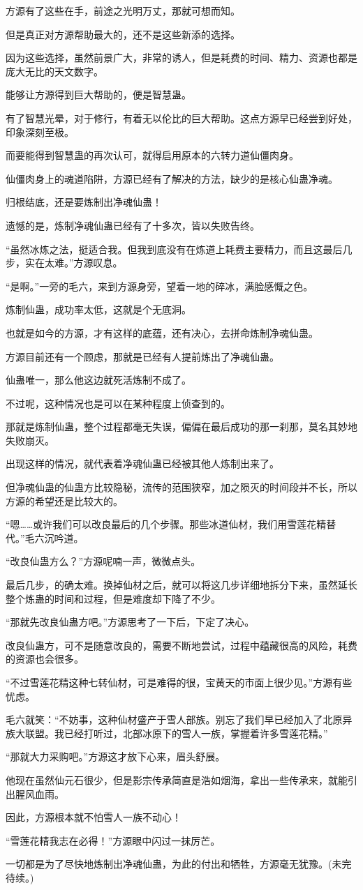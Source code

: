 \begin{this_body}
方源有了这些在手，前途之光明万丈，那就可想而知。

但是真正对方源帮助最大的，还不是这些新添的选择。

因为这些选择，虽然前景广大，非常的诱人，但是耗费的时间、精力、资源也都是庞大无比的天文数字。

能够让方源得到巨大帮助的，便是智慧蛊。

有了智慧光晕，对于修行，有着无以伦比的巨大帮助。这点方源早已经尝到好处，印象深刻至极。

而要能得到智慧蛊的再次认可，就得启用原本的六转力道仙僵肉身。

仙僵肉身上的魂道陷阱，方源已经有了解决的方法，缺少的是核心仙蛊净魂。

归根结底，还是要炼制出净魂仙蛊！

遗憾的是，炼制净魂仙蛊已经有了十多次，皆以失败告终。

“虽然冰炼之法，挺适合我。但我到底没有在炼道上耗费主要精力，而且这最后几步，实在太难。”方源叹息。

“是啊。”一旁的毛六，来到方源身旁，望着一地的碎冰，满脸感慨之色。

炼制仙蛊，成功率太低，这就是个无底洞。

也就是如今的方源，才有这样的底蕴，还有决心，去拼命炼制净魂仙蛊。

方源目前还有一个顾虑，那就是已经有人提前炼出了净魂仙蛊。

仙蛊唯一，那么他这边就死活炼制不成了。

不过呢，这种情况也是可以在某种程度上侦查到的。

那就是炼制仙蛊，整个过程都毫无失误，偏偏在最后成功的那一刹那，莫名其妙地失败崩灭。

出现这样的情况，就代表着净魂仙蛊已经被其他人炼制出来了。

但净魂仙蛊的仙蛊方比较隐秘，流传的范围狭窄，加之陨灭的时间段并不长，所以方源的希望还是比较大的。

“嗯……或许我们可以改良最后的几个步骤。那些冰道仙材，我们用雪莲花精替代。”毛六沉吟道。

“改良仙蛊方么？”方源呢喃一声，微微点头。

最后几步，的确太难。换掉仙材之后，就可以将这几步详细地拆分下来，虽然延长整个炼蛊的时间和过程，但是难度却下降了不少。

“那就先改良仙蛊方吧。”方源思考了一下后，下定了决心。

改良仙蛊方，可不是随意改良的，需要不断地尝试，过程中蕴藏很高的风险，耗费的资源也会很多。

“不过雪莲花精这种七转仙材，可是难得的很，宝黄天的市面上很少见。”方源有些忧虑。

毛六就笑：“不妨事，这种仙材盛产于雪人部族。别忘了我们早已经加入了北原异族大联盟。我已经打听过，北部冰原下的雪人一族，掌握着许多雪莲花精。”

“那就大力采购吧。”方源这才放下心来，眉头舒展。

他现在虽然仙元石很少，但是影宗传承简直是浩如烟海，拿出一些传承来，就能引出腥风血雨。

因此，方源根本就不怕雪人一族不动心！

“雪莲花精我志在必得！”方源眼中闪过一抹厉芒。

一切都是为了尽快地炼制出净魂仙蛊，为此的付出和牺牲，方源毫无犹豫。(未完待续。)

\end{this_body}

